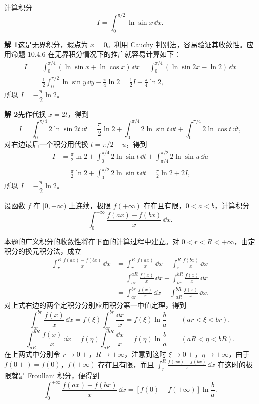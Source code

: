 \begin{xexample}[12.3.4（Euler 积分）]
计算积分
\[
  I=\int_0^{\pi/2}\ln\sin x\,\dd x.
\]
\end{xexample}
\begin{xsolution}
\textbf{解 1}\quad 这是无界积分，瑕点为 $x=0$。利用 Cauchy 判别法，容易验证其收敛性。应用命题 10.4.6 在无界积分情况下的推广就容易计算如下：
\begin{align*}
  I
  &=\int_0^{\pi/4}(\ln\sin x+\ln\cos x)\,\dd x
   =\int_0^{\pi/4}(\ln\sin2x-\ln2)\,\dd x\\
  &=\frac12\int_0^{\pi/2}\ln\sin y\,\dd y-\frac\pi4\ln2
   =\frac12I-\frac\pi4\ln2,
\end{align*}
所以 $I=-\dfrac\pi2\ln2$。

\textbf{解 2}\quad 先作代换 $x=2t$，得到
\[
  I=\int_0^{\pi/4}2\ln\sin2t\,\dd t
   =\frac\pi2\ln2+\int_0^{\pi/4}2\ln\sin t\,\dd t
   +\int_0^{\pi/4}2\ln\cos t\,\dd t,
\]
对右边最后一个积分用代换 $t=\pi/2-u$，得到
\begin{align*}
  I
  &=\frac\pi2\ln2+\int_0^{\pi/4}2\ln\sin t\,\dd t
   +\int_{\pi/4}^{\pi/2}2\ln\sin u\,\dd u\\
  &=\frac\pi2\ln2+\int_0^{\pi/2}2\ln\sin t\,\dd t
   =\frac\pi2\ln2+2I,
\end{align*}
所以 $I=-\dfrac\pi2\ln2$。
\end{xsolution}

\begin{xexample}
设函数 $f$ 在 $[0,+\infty)$ 上连续，极限 $f(+\infty)$ 存在且有限，$0<a<b$，计算积分
\[
  \int_0^{+\infty}\frac{f(ax)-f(bx)}x\,\dd x.
\]
\end{xexample}
\begin{xsolution}
本题的广义积分的收敛性将在下面的计算过程中建立。对 $0<r<R<+\infty$，由定积分的换元积分法，成立
\begin{align*}
  \int_r^R\frac{f(ax)-f(bx)}x\,\dd x
  &=\int_r^R\frac{f(ax)}x\,\dd x-\int_r^R\frac{f(bx)}x\,\dd x\\
  &=\int_{ar}^{aR}\frac{f(x)}x\,\dd x-\int_{br}^{bR}\frac{f(x)}x\,\dd x\\
  &=\int_{ar}^{br}\frac{f(x)}x\,\dd x-\int_{aR}^{bR}\frac{f(x)}x\,\dd x.
\end{align*}
对上式右边的两个定积分分别应用积分第一中值定理，得到
\[
  \int_{ar}^{br}\frac{f(x)}x\,\dd x
  =f(\xi)\int_{ar}^{br}\frac{\dd x}x
  =f(\xi)\ln\frac ba\qquad(ar<\xi<br),
\]
\[
  \int_{aR}^{bR}\frac{f(x)}x\,\dd x
  =f(\eta)\int_{aR}^{bR}\frac{\dd x}x
  =f(\eta)\ln\frac ba\qquad(aR<\eta<bR).
\]
在上两式中分别令 $r\to0+$，$R\to+\infty$，注意到这时 $\xi\to0+$，$\eta\to+\infty$，由于 $f(0+)=f(0)$，$f(+\infty)$ 存在且有限，而且 $\int_r^R\frac{f(ax)-f(bx)}x\,\dd x$ 在这时的极限就是 Froullani 积分，便得到
\[
  \int_0^{+\infty}\frac{f(ax)-f(bx)}x\,\dd x
  =[f(0)-f(+\infty)]\ln\frac ba.
\]
\end{xsolution}

